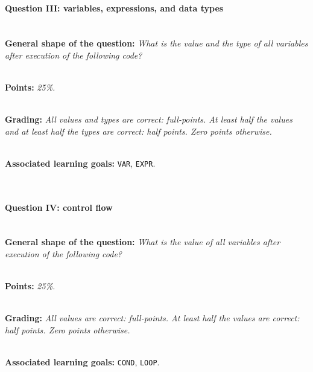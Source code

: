 \ \\ 

\paragraph{Question III: variables, expressions, and data types}

\ \\ 

\textbf{General shape of the question:} \textit{What is the value and the type of all variables after execution of the following code?}

\ \\ 

\textbf{Points:} \textit{25\%.}

\ \\ 

\textbf{Grading:} \textit{All values and types are correct: full-points. At least half the values and at least half the types are correct: half points. Zero points otherwise.}

\ \\ 

\textbf{Associated learning goals:} \texttt{VAR}, \texttt{EXPR}.

\ \\ 

\paragraph{Question IV: control flow}

\ \\ 

\textbf{General shape of the question:} \textit{What is the value of all variables after execution of the following code?}

\ \\ 

\textbf{Points:} \textit{25\%.}

\ \\ 

\textbf{Grading:} \textit{All values are correct: full-points. At least half the values are correct: half points. Zero points otherwise.}

\ \\ 

\textbf{Associated learning goals:} \texttt{COND}, \texttt{LOOP}.

\ \\ 
